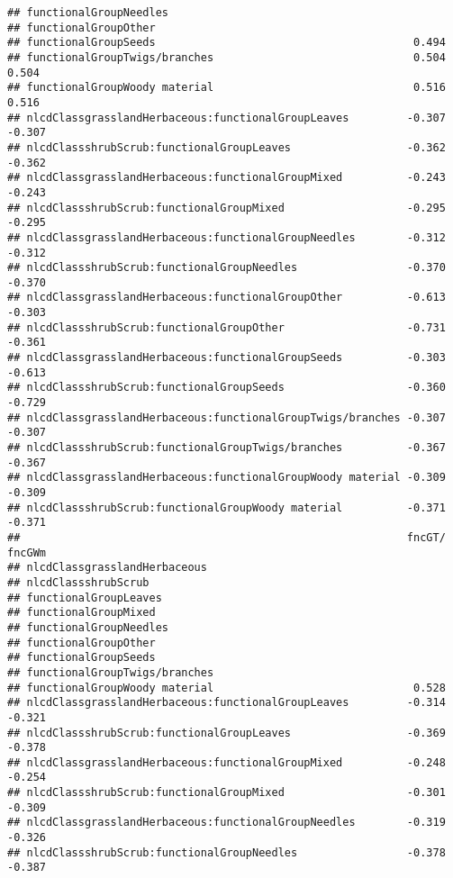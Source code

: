 \documentclass[]{article}
\begin{document}
\begin{verbatim}
## functionalGroupNeedles                                                  
## functionalGroupOther                                                    
## functionalGroupSeeds                                        0.494       
## functionalGroupTwigs/branches                               0.504  0.504
## functionalGroupWoody material                               0.516  0.516
## nlcdClassgrasslandHerbaceous:functionalGroupLeaves         -0.307 -0.307
## nlcdClassshrubScrub:functionalGroupLeaves                  -0.362 -0.362
## nlcdClassgrasslandHerbaceous:functionalGroupMixed          -0.243 -0.243
## nlcdClassshrubScrub:functionalGroupMixed                   -0.295 -0.295
## nlcdClassgrasslandHerbaceous:functionalGroupNeedles        -0.312 -0.312
## nlcdClassshrubScrub:functionalGroupNeedles                 -0.370 -0.370
## nlcdClassgrasslandHerbaceous:functionalGroupOther          -0.613 -0.303
## nlcdClassshrubScrub:functionalGroupOther                   -0.731 -0.361
## nlcdClassgrasslandHerbaceous:functionalGroupSeeds          -0.303 -0.613
## nlcdClassshrubScrub:functionalGroupSeeds                   -0.360 -0.729
## nlcdClassgrasslandHerbaceous:functionalGroupTwigs/branches -0.307 -0.307
## nlcdClassshrubScrub:functionalGroupTwigs/branches          -0.367 -0.367
## nlcdClassgrasslandHerbaceous:functionalGroupWoody material -0.309 -0.309
## nlcdClassshrubScrub:functionalGroupWoody material          -0.371 -0.371
##                                                            fncGT/ fncGWm
## nlcdClassgrasslandHerbaceous                                            
## nlcdClassshrubScrub                                                     
## functionalGroupLeaves                                                   
## functionalGroupMixed                                                    
## functionalGroupNeedles                                                  
## functionalGroupOther                                                    
## functionalGroupSeeds                                                    
## functionalGroupTwigs/branches                                           
## functionalGroupWoody material                               0.528       
## nlcdClassgrasslandHerbaceous:functionalGroupLeaves         -0.314 -0.321
## nlcdClassshrubScrub:functionalGroupLeaves                  -0.369 -0.378
## nlcdClassgrasslandHerbaceous:functionalGroupMixed          -0.248 -0.254
## nlcdClassshrubScrub:functionalGroupMixed                   -0.301 -0.309
## nlcdClassgrasslandHerbaceous:functionalGroupNeedles        -0.319 -0.326
## nlcdClassshrubScrub:functionalGroupNeedles                 -0.378 -0.387

\end{verbatim}
\end{document}
